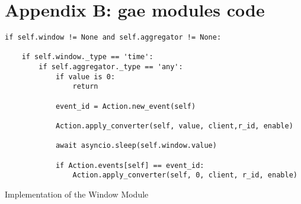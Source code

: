 \chapter{Appendix B: \acf{gae} modules code}
\label{chapter:appendix-b}

\begin{listing}[H]
	\begin{verbatim}
if self.window != None and self.aggregator != None:

    if self.window._type == 'time':
        if self.aggregator._type == 'any':
            if value is 0:
                return

            event_id = Action.new_event(self)

            Action.apply_converter(self, value, client,r_id, enable)

            await asyncio.sleep(self.window.value)

            if Action.events[self] == event_id:
                Action.apply_converter(self, 0, client, r_id, enable)
	\end{verbatim}
	\caption{Implementation of the Window Module}
	\label{snippet:rule}
\end{listing}
